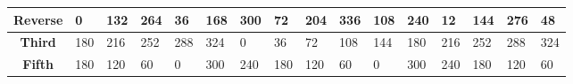 \documentclass{reportClass}
\begin{document}
\begin{table}[h!]
\begin{tabular}{|clllllllllllllll|}
\multicolumn{1}{|c|}{\textbf{Reverse}} & \multicolumn{1}{l|}{0}                                   & \multicolumn{1}{l|}{132}                                 & \multicolumn{1}{l|}{264}                                 & \multicolumn{1}{l|}{36}                                  & \multicolumn{1}{l|}{168}                                 & \multicolumn{1}{l|}{300}                                 & \multicolumn{1}{l|}{72}                                  & \multicolumn{1}{l|}{204}                                 & \multicolumn{1}{l|}{336}                                 & \multicolumn{1}{l|}{108}                                 & \multicolumn{1}{l|}{240}                                 & \multicolumn{1}{l|}{12}                                  & \multicolumn{1}{l|}{144}                                 & \multicolumn{1}{l|}{276}                                 & 48                                  \\ \hline
\multicolumn{1}{|c|}{\textbf{Third}}   & \multicolumn{1}{l|}{180}                                 & \multicolumn{1}{l|}{216}                                 & \multicolumn{1}{l|}{252}                                 & \multicolumn{1}{l|}{288}                                 & \multicolumn{1}{l|}{324}                                 & \multicolumn{1}{l|}{0}                                   & \multicolumn{1}{l|}{36}                                  & \multicolumn{1}{l|}{72}                                  & \multicolumn{1}{l|}{108}                                 & \multicolumn{1}{l|}{144}                                 & \multicolumn{1}{l|}{180}                                 & \multicolumn{1}{l|}{216}                                 & \multicolumn{1}{l|}{252}                                 & \multicolumn{1}{l|}{288}                                 & 324                                 \\ \hline
\multicolumn{1}{|c|}{\textbf{Fifth}}   & \multicolumn{1}{l|}{180}                                 & \multicolumn{1}{l|}{120}                                 & \multicolumn{1}{l|}{60}                                  & \multicolumn{1}{l|}{0}                                   & \multicolumn{1}{l|}{300}                                 & \multicolumn{1}{l|}{240}                                 & \multicolumn{1}{l|}{180}                                 & \multicolumn{1}{l|}{120}                                 & \multicolumn{1}{l|}{60}                                  & \multicolumn{1}{l|}{0}                                   & \multicolumn{1}{l|}{300}                                 & \multicolumn{1}{l|}{240}                                 & \multicolumn{1}{l|}{180}                                 & \multicolumn{1}{l|}{120}                                 & 60                                  \\ \hline

\end{tabular}
\end{table}
\end{document}
